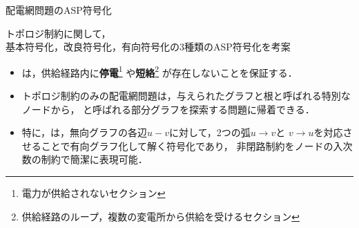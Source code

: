 \documentclass[dvipdfmx,11pt]{beamer}
\begin{document}
\begin{frame}{配電網問題のASP符号化}
  \renewcommand{\thefootnote}{\fnsymbol{footnote}}
  \setcounter{footnote}{1}
\begin{block}{}
\centering
トポロジ制約に関して，\\
基本符号化，改良符号化，有向符号化の3種類のASP符号化を考案
\end{block}
 \vfill
 \begin{itemize}
  \item {}は，供給経路内に\textbf{停電}\footnote{%
        電力が供給されないセクション}%
        や\textbf{短絡}\footnote{供給経路のループ，複数の変電所から供給を受けるセクション}
        が存在しないことを保証する．
  \item トポロジ制約のみの配電網問題は，与えられたグラフと根と呼ばれる特別なノードから，
        と呼ばれる部分グラフを探索する問題に帰着できる．
  \item 特に，は，無向グラフの各辺$u-v$に対して，2つの弧$u\rightarrow v$と
        $v\rightarrow u$を対応させることで有向グラフ化して解く符号化であり，
        非閉路制約をノードの入次数の制約で簡潔に表現可能．
 \end{itemize}
\end{frame}
\end{document}
